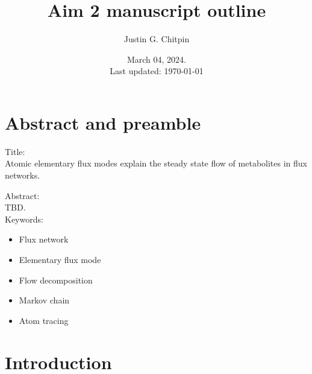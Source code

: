 \documentclass[11pt]{article}
\begin{document}
\title{Aim 2 manuscript outline}
\author{Justin G. Chitpin}
\date{March 04, 2024.\\Last updated: \today}

\maketitle

\section{Abstract and preamble}

Title:\\

\noindent Atomic elementary flux modes explain the steady state flow of metabolites in flux networks.\\

\newline

\noindent Abstract:\\

TBD.\\

\noindent Keywords:
\begin{itemize}
    \item Flux network
    \item Elementary flux mode
    \item Flow decomposition
    \item Markov chain
    \item Atom tracing
\end{itemize}

\section{Introduction}
\end{document}
